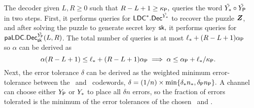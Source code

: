 \begin{IEEEproof}
    The decoder given $L,R \geq 0$ such that $R - L + 1 \geq \kappa_{\mathsf{P}},$ queries the word $\tilde{Y_{*}} \circ \tilde{Y_{\mathsf{P}}}$ in two steps. 
    First, it performs queries for $\mathsf{LDC}^*.\mathsf{Dec}^{\tilde{Y_{*}}}$ to recover the puzzle $\boldsymbol{Z}$, and after solving the puzzle to generate secret key $\mathsf{sk},$ it performs queries for $\mathsf{paLDC}.\mathsf{Dec}_{\mathsf{sk}}^{\tilde{Y_{\mathsf{P}}}}(L,R)$. 
    The total number of queries is at most $\ell_* + (R - L + 1) \alpha_{\mathsf{P}}$ so $\alpha$ can be derived as
    \[\alpha (R - L + 1) \leq \ell_* + (R - L + 1)\alpha_{\mathsf{P}} \implies \alpha \leq \alpha_{\mathsf{P}} + \ell_* / \kappa_{\mathsf{P}}.\]
    Next, the error tolerance $\delta$ can be derived as the weighted minimum error-tolerance between the \LDCStar\ and \paLDC\ codewords, $\delta = (1/n) \times \min\{\delta_* n_{\mathsf{*}}, \delta_{\mathsf{P}} n_{\mathsf{P}}\}.$
    A channel can choose either $Y_{\mathsf{P}}$ or $Y_{*}$ to place all $\delta n$ errors, so the fraction of errors tolerated is the minimum of the error tolerances of the chosen \LDCStar \ and \paLDC. 
    

\end{IEEEproof}
